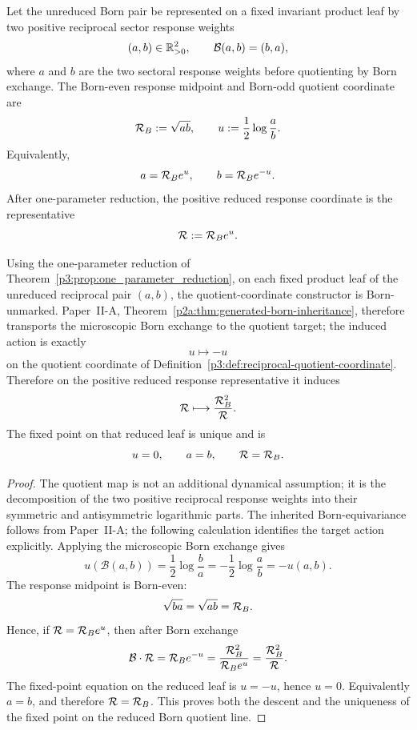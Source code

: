 \documentclass[12pt,a4paper]{article}
\begin{document}
\begin{definition}

\label{p3:def:reciprocal-quotient-coordinate}
Let the unreduced Born pair be represented on a fixed invariant product leaf by two positive
reciprocal sector response weights
\[
        (a,b)\in\mathbb{R}_{>0}^2,
        \qquad
        \mathcal B(a,b)=(b,a),
\]
where \(a\) and \(b\) are the two sectoral response weights before quotienting by
Born exchange.  The Born-even response midpoint and Born-odd quotient coordinate are
\[
        \mathcal R_B:=\sqrt{ab},
        \qquad
        u:=\frac12\log\frac{a}{b}.
\]
Equivalently,
\[
        a=\mathcal R_B e^u,
        \qquad
        b=\mathcal R_B e^{-u}.
\]
After one-parameter reduction, the positive reduced response coordinate is the representative
\[
        \mathcal R:=\mathcal R_B e^u .
\]
\end{definition}

\begin{lemma}
\label{p3:lem:reduced-born-reciprocity}
Using the one-parameter reduction of Theorem~\ref{p3:prop:one_parameter_reduction}, on each fixed product leaf of the
unreduced reciprocal pair \((a,b)\), the quotient-coordinate constructor is
Born-unmarked.  Paper~II-A,
Theorem~\ref{p2a:thm:generated-born-inheritance}, therefore transports the
microscopic Born exchange to the quotient target; the induced action is exactly
\[
        u\longmapsto -u
\]
on the quotient coordinate of Definition~\ref{p3:def:reciprocal-quotient-coordinate}.  Therefore
on the positive reduced response representative it induces
\[
        \mathcal R\longmapsto \frac{\mathcal R_B^2}{\mathcal R}.
\]
The fixed point on that reduced leaf is unique and is
\[
        u=0,
        \qquad
        a=b,
        \qquad
        \mathcal R=\mathcal R_B .
\]
\end{lemma}

\begin{proof}
The quotient map is not an additional dynamical assumption; it is the decomposition of the two
positive reciprocal response weights into their symmetric and antisymmetric logarithmic parts.  The inherited
Born-equivariance follows from Paper~II-A; the following calculation identifies
the target action explicitly.  Applying the microscopic Born exchange gives
\[
        u(\mathcal B(a,b))
        =\frac12\log\frac{b}{a}
        =-\frac12\log\frac{a}{b}
        =-u(a,b).
\]
The response midpoint is Born-even:
\[
        \sqrt{ba}=\sqrt{ab}=\mathcal R_B .
\]
Hence, if \(\mathcal R=\mathcal R_B e^u\), then after Born exchange
\[
        \mathcal B\cdot\mathcal R
        =\mathcal R_B e^{-u}
        =\frac{\mathcal R_B^2}{\mathcal R_B e^u}
        =\frac{\mathcal R_B^2}{\mathcal R}.
\]
The fixed-point equation on the reduced leaf is \(u=-u\), hence \(u=0\).  Equivalently
\(a=b\), and therefore \(\mathcal R=\mathcal R_B\).  This proves both the descent and the uniqueness of the
fixed point on the reduced Born quotient line.
\end{proof}
\end{document}
